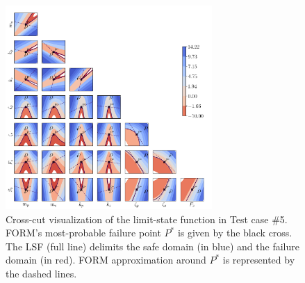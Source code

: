 \begin{figure}
    \centering
    \includegraphics[width=0.7\textwidth]{part3/figures/BANCS/crosscut_oscillator.png}
    \caption{Cross-cut visualization of the limit-state function in Test case \#5. 
    FORM's most-probable failure point $P^*$ is given by the black cross. 
    The LSF (full line) delimits the safe domain (in blue) and the failure domain (in red). 
    FORM approximation around $P^*$ is represented by the dashed lines.}
    \label{fig:crosscut_oscillator}
\end{figure}


